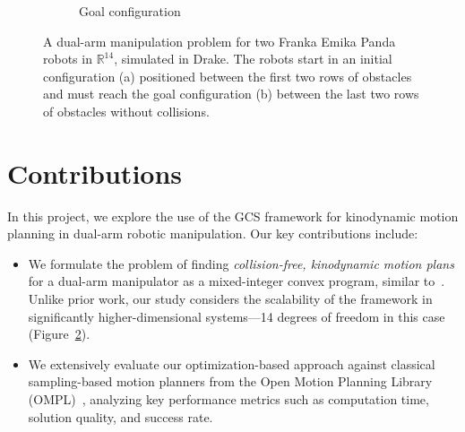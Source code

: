 \documentclass[conference]{IEEEtran}
\begin{document}
\begin{figure}[!t]
\begin{subfigure}[b]{0.19\textwidth}
        \captionsetup{justification=centering}
        \caption{Goal configuration}
        \label{subfig:cage_goal_orbit}
    \end{subfigure}
    \caption{A dual-arm manipulation problem for two Franka Emika Panda robots in $\mathbb{R}^{14}$, simulated in Drake. The robots start in an initial configuration (a) positioned between the first two rows of obstacles and must reach the goal configuration (b) between the last two rows of obstacles without collisions.}
    \label{fig:simulation}
\end{figure}

\section{Contributions}
In this project, we explore the use of the GCS framework for kinodynamic motion planning in dual-arm robotic manipulation.
%
Our key contributions include:
\begin{itemize}
    \item We formulate the problem of finding \textit{collision-free, kinodynamic motion plans} for a dual-arm manipulator as a mixed-integer convex program, similar to~\cite{marcucci2023motion}.
    Unlike prior work, our study considers the scalability of the framework in significantly higher-dimensional systems---14 degrees of freedom in this case (Figure~\ref{fig:simulation}).
    \item We extensively evaluate our optimization-based approach against classical sampling-based motion planners from the Open Motion Planning Library (OMPL)~\cite{sucan2012open}, analyzing key performance metrics such as computation time, solution quality, and success rate.
\end{itemize}



\end{document}
